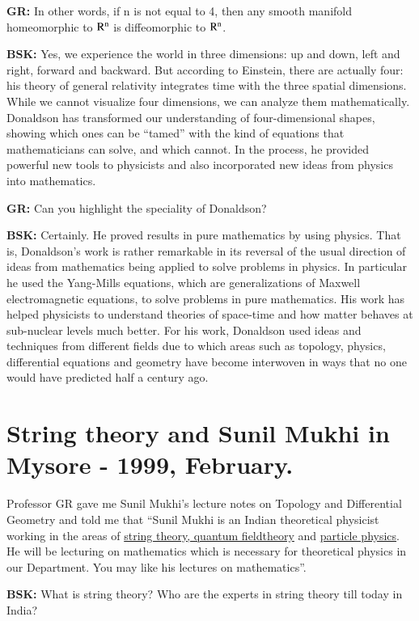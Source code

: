 \textbf{GR:} In other words, if n is not equal to 4, then any smooth manifold homeomorphic to ${\rm R}^{\rm n}$ is diffeomorphic to ${\rm R}^{\rm n}$.
\vskip 1pt

\textbf{BSK:}  Yes, we experience the world in three dimensions: up and down, left and right, forward and backward. But according to Einstein, there are actually four: his theory of general relativity integrates time with the three spatial dimensions. While we cannot visualize four dimensions, we can analyze them mathematically. Donaldson has transformed our understanding of four-dimensional shapes, showing which ones can be “tamed” with the kind of equations that mathematicians can solve, and which cannot. In the process, he provided powerful new tools to physicists and also incorporated new ideas from physics into mathematics.
\vskip 1pt

\textbf{GR:} Can you highlight the speciality of Donaldson?
\vskip 1pt

\textbf{BSK:} Certainly. He proved results in pure mathematics by using physics. That is, Donaldson’s work is rather remarkable in its reversal of the usual direction of ideas from mathematics being applied to solve problems in physics. In particular he used the Yang-Mills equations, which are generalizations of Maxwell electromagnetic equations, to solve problems in pure mathematics.  His work has helped physicists to understand theories of space-time and how matter behaves at sub-nuclear levels much better. For his work, Donaldson used ideas and techniques from different fields due to which areas such as topology, physics, differential equations and geometry have become interwoven in ways that no one would have predicted half a century ago.

\section*{String theory and Sunil Mukhi in\\ Mysore - 1999, February.}

Professor GR gave me Sunil Mukhi’s lecture notes on Topology and Differential Geometry and told me that “Sunil Mukhi is an Indian theoretical physicist working in the areas of \underline{string theory, quantum field}\break \underline{theory} and \underline{particle physics}. He will be lecturing on mathematics which is necessary for theoretical physics in our Department. You may like his lectures on mathematics”.

\textbf{BSK:} What is string theory? Who are the experts in string theory till today in India?

